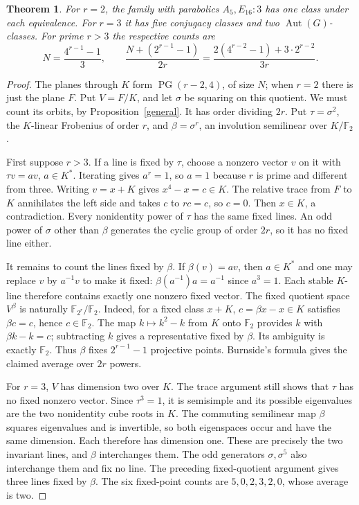 \documentclass[11pt]{article}
\newtheorem{theorem}{Theorem}
\newcommand{\F}{\mathbb F}
\newcommand{\PG}{\operatorname{PG}}
\newcommand{\Aut}{\operatorname{Aut}}
\begin{document}
\begin{theorem}\label{four}
For $r=2$, the family with parabolics $A_5,E_{16}:3$ has one class
under each equivalence. For $r=3$ it has five conjugacy classes and two
$\Aut(G)$-classes. For prime $r>3$ the respective counts are
\[
 N=\frac{4^{r-1}-1}{3},\qquad
 \frac{N+(2^{r-1}-1)}{2r}
 =\frac{2(4^{r-2}-1)+3\cdot2^{r-2}}{3r}.
\]
\end{theorem}
\begin{proof}
The planes through $K$ form $\PG(r-2,4)$, of size $N$; when $r=2$
there is just the plane $F$. Put $V=F/K$, and let $\sigma$ be squaring
on this quotient. We must count its orbits, by Proposition~\ref{general}.
It has order dividing $2r$. Put $\tau=\sigma^2$, the $K$-linear
Frobenius of order $r$, and $\beta=\sigma^r$, an involution semilinear
over $K/\F_2$.

First suppose $r>3$. If a line is fixed by $\tau$, choose a nonzero
vector $v$ on it with $\tau v=av$, $a\in K^*$. Iterating gives
$a^r=1$, so $a=1$ because $r$ is prime and different from three.
Writing $v=x+K$ gives $x^4-x=c\in K$. The relative trace from $F$
to $K$ annihilates the left side and takes $c$ to $rc=c$, so $c=0$.
Then $x\in K$, a contradiction. Every nonidentity power of $\tau$
has the same fixed lines. An odd power of $\sigma$ other than $\beta$
generates the cyclic group of order $2r$, so it has no fixed line either.

It remains to count the lines fixed by $\beta$. If $\beta(v)=av$,
then $a\in K^*$ and one may replace $v$ by $a^{-1}v$ to make it
fixed: $\beta(a^{-1})a=a^{-1}$ since $a^3=1$. Each stable $K$-line
therefore contains exactly one nonzero fixed vector. The fixed quotient
space $V^\beta$ is naturally $\F_{2^r}/\F_2$. Indeed, for a fixed
class $x+K$, $c=\beta x-x\in K$ satisfies $\beta c=c$, hence
$c\in\F_2$. The map $k\mapsto k^2-k$ from $K$ onto $\F_2$
provides $k$ with $\beta k-k=c$; subtracting $k$ gives a representative
fixed by $\beta$. Its ambiguity is exactly $\F_2$. Thus $\beta$
fixes $2^{r-1}-1$ projective points. Burnside's formula gives the claimed
average over $2r$ powers.

For $r=3$, $V$ has dimension two over $K$. The trace argument still
shows that $\tau$ has no fixed nonzero vector. Since $\tau^3=1$,
it is semisimple and its possible eigenvalues are the two nonidentity
cube roots in $K$. The commuting semilinear map $\beta$ squares
eigenvalues and is invertible, so both eigenspaces occur and have the
same dimension. Each therefore has dimension one. These are precisely
the two invariant lines, and $\beta$ interchanges them. The odd
generators $\sigma,\sigma^5$ also
interchange them and fix no line. The preceding fixed-quotient argument
gives three lines fixed by $\beta$. The six fixed-point counts are
$5,0,2,3,2,0$, whose average is two.
\end{proof}
\end{document}
